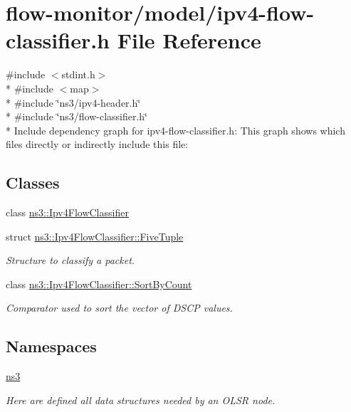 \hypertarget{ipv4-flow-classifier_8h}{}\section{flow-\/monitor/model/ipv4-\/flow-\/classifier.h File Reference}
\label{ipv4-flow-classifier_8h}
{\ttfamily \#include $<$stdint.\+h$>$}\\*
{\ttfamily \#include $<$map$>$}\\*
{\ttfamily \#include \char`\"{}ns3/ipv4-\/header.\+h\char`\"{}}\\*
{\ttfamily \#include \char`\"{}ns3/flow-\/classifier.\+h\char`\"{}}\\*
Include dependency graph for ipv4-\/flow-\/classifier.h\+:
This graph shows which files directly or indirectly include this file\+:
\subsection*{Classes}
\begin{DoxyCompactItemize}
\item 
class \hyperlink{classns3_1_1Ipv4FlowClassifier}{ns3\+::\+Ipv4\+Flow\+Classifier}
\item 
struct \hyperlink{structns3_1_1Ipv4FlowClassifier_1_1FiveTuple}{ns3\+::\+Ipv4\+Flow\+Classifier\+::\+Five\+Tuple}
\begin{DoxyCompactList}\small\item\em Structure to classify a packet. \end{DoxyCompactList}\item 
class \hyperlink{classns3_1_1Ipv4FlowClassifier_1_1SortByCount}{ns3\+::\+Ipv4\+Flow\+Classifier\+::\+Sort\+By\+Count}
\begin{DoxyCompactList}\small\item\em Comparator used to sort the vector of D\+S\+CP values. \end{DoxyCompactList}\end{DoxyCompactItemize}
\subsection*{Namespaces}
\begin{DoxyCompactItemize}
\item 
 \hyperlink{namespacens3}{ns3}
\begin{DoxyCompactList}\small\item\em Here are defined all data structures needed by an O\+L\+SR node. \end{DoxyCompactList}\end{DoxyCompactItemize}
